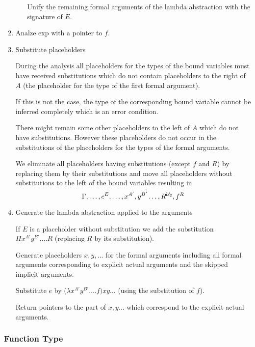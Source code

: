 \begin{enumerate}
\begin{enumerate}
    Unify the remaining formal arguments of the lambda abstraction with the
    signature of $E$.
  \end{enumerate}


\item Analze $\text{exp}$ with a pointer to $f$.

\item Substitute placeholders

  During the analysis all placeholders for the types of the bound variables
  must have received substitutions which do not contain placeholders to the
  right of $A$ (the placeholder for the type of the first formal argument).

  If this is not the case, the type of the corresponding bound variable cannot
  be inferred completely which is an error condition.

  There might remain some other placeholders to the left of $A$ which do not
  have substitutions. However these placeholders do not occur in the
  substitutions of the placeholders for the types of the formal arguments.

  We eliminate all placeholders having substitutions (except $f$ and $R$) by
  replacing them by their substitutions and move all placeholders without
  substitutions to the left of the bound variables resulting in
  $$
  \Gamma, \ldots, e^E, \ldots, x^{A'}, y^{B'} \ldots, R^{{\cal{U}}_2}, f^R
  $$

\item Generate the lambda abstraction applied to the arguments

  If $E$ is a placeholder without substitution we add the substitution $\Pi
  x^{A'} y^{B'} \ldots . R$ (replacing $R$ by its substitution).

  Generate placeholders $x, y, \ldots$ for the formal arguments including all
  formal arguments corresponding to explicit actual arguments and the skipped
  implicit arguments.

  Substitute $e$ by ($\lambda x^{A'} y^{B'} \ldots . f) x y \ldots$ (using the
  substitution of $f$).

  Return pointers to the part of $x, y \ldots$ which correspond to the
  explicit actual arguments.

\end{enumerate}





\vskip 5mm
\subsubsection{Function Type}


